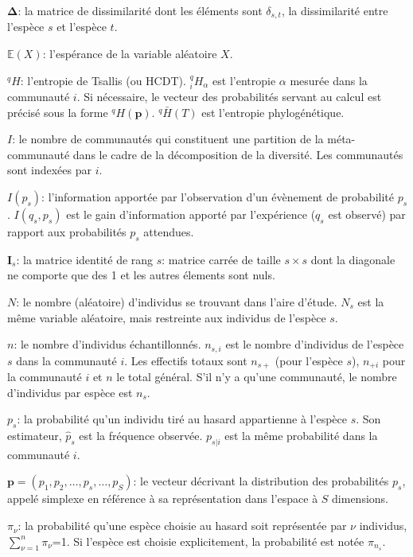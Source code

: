 \documentclass[
  11pt,
  french,
  a4paper,
  extrafontsizes,onecolumn,openright
  ]{memoir}
\begin{document}
\noindent \(\boldsymbol{\Delta}\): la matrice de dissimilarité dont les éléments sont \(\delta_{s,t}\), la dissimilarité entre l'espèce \(s\) et l'espèce \(t\).

\noindent \({\mathbb E}\left(X\right)\): l'espérance de la variable aléatoire \(X\).

\noindent \(^{q}\!H\): l'entropie de Tsallis (ou HCDT).
\(^{q}_{i}\!H_{\alpha}\) est l'entropie \(\alpha\) mesurée dans la communauté \(i\).
Si nécessaire, le vecteur des probabilités servant au calcul est précisé sous la forme \(^{q}\!H(\mathbf{p})\).
\(^{q}\!\bar{H}(T)\) est l'entropie phylogénétique.

\noindent \(I\): le nombre de communautés qui constituent une partition de la méta-communauté dans le cadre de la décomposition de la diversité.
Les communautés sont indexées par \(i\).

\noindent \(I(p_s)\): l'information apportée par l'observation d'un évènement de probabilité \(p_s\).
\(I(q_s,p_s)\) est le gain d'information apporté par l'expérience (\(q_s\) est observé) par rapport aux probabilités \(p_s\) attendues.

\noindent \(\mathbf{I}_s\): la matrice identité de rang \(s\): matrice carrée de taille \(s\times s\) dont la diagonale ne comporte que des 1 et les autres élements sont nuls.

\noindent \(N\): le nombre (aléatoire) d'individus se trouvant dans l'aire d'étude.
\(N_s\) est la même variable aléatoire, mais restreinte aux individus de l'espèce \(s\).

\noindent \(n\): le nombre d'individus échantillonnés.
\(n_{s,i}\) est le nombre d'individus de l'espèce \(s\) dans la communauté \(i\).
Les effectifs totaux sont \(n_{s+}\) (pour l'espèce \(s\)), \(n_{+i}\) pour la communauté \(i\) et \(n\) le total général.
S'il n'y a qu'une communauté, le nombre d'individus par espèce est \(n_s\).

\noindent \(p_s\): la probabilité qu'un individu tiré au hasard appartienne à l'espèce \(s\).
Son estimateur, \({\hat{p}}_s\) est la fréquence observée.
\(p_{s|i}\) est la même probabilité dans la communauté \(i\).

\noindent \(\mathbf{p}=\left( p_1, p_2, \dots, p_s, \dots, p_S \right)\): le vecteur décrivant la distribution des probabilités \(p_s\), appelé simplexe en référence à sa représentation dans l'espace à \(S\) dimensions.

\noindent \({\pi}_{\nu}\): la probabilité qu'une espèce choisie au hasard soit représentée par \(\nu\) individus, \(\sum^n_{\nu=1}{{\pi}_{\nu}}\)=1.
Si l'espèce est choisie explicitement, la probabilité est notée \({\pi}_{n_s}\).
\end{document}

